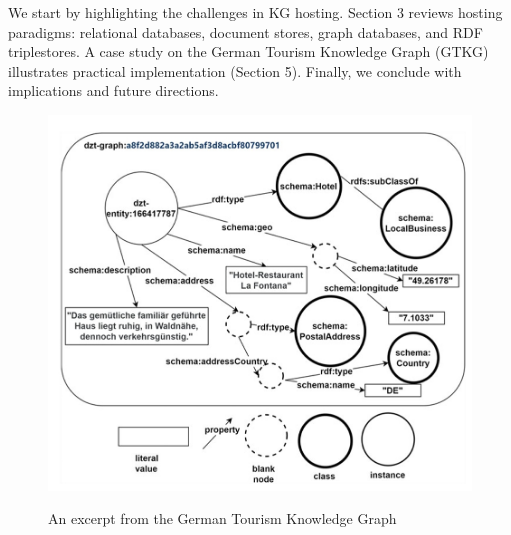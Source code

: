 \documentclass[12pt]{article}
\begin{document}
We start by highlighting the challenges in KG hosting. Section 3 reviews hosting paradigms: relational databases, document stores, graph databases, and RDF triplestores. A case study on the German Tourism Knowledge Graph (GTKG) illustrates practical implementation (Section 5). Finally, we conclude with implications and future directions.
\begin{figure}
    \includegraphics[width=\linewidth]{imgs/gtkg-example.jpeg}
    \label{fig:gtkg-example}
    \caption{An excerpt from the German Tourism Knowledge Graph}
\end{figure}
\end{document}
